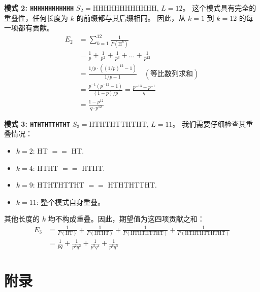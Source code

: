 \documentclass[UTF8]{ctexart}
\begin{document}
\textbf{模式 2: \texttt{HHHHHHHHHHHH}}
$S_2 = \text{HHHHHHHHHHHH}$, $L=12$。
这个模式具有完全的重叠性，任何长度为 $k$ 的前缀都与其后缀相同。
因此，从 $k=1$ 到 $k=12$ 的每一项都有贡献。
\begin{align*}
    E_2 &= \sum_{k=1}^{12} \frac{1}{P(\text{H}^k)} \\
        &= \frac{1}{p} + \frac{1}{p^2} + \frac{1}{p^3} + \dots + \frac{1}{p^{12}} \\
        &= \frac{1/p \cdot ((1/p)^{12} - 1)}{1/p - 1} \quad (\text{等比数列求和}) \\
        &= \frac{p^{-1}(p^{-12}-1)}{(1-p)/p} = \frac{p^{-13}-p^{-1}}{q} \\
        &= \frac{1-p^{12}}{q \cdot p^{12}}
\end{align*}

\textbf{模式 3: \texttt{HTHTHTTHTHT}}
$S_3 = \text{HTHTHTTHTHT}$, $L=11$。
我们需要仔细检查其重叠情况：
\begin{itemize}
    \item $k=2$: HT $==$ HT.
    \item $k=4$: HTHT $==$ HTHT.
    \item $k=9$: HTHTHTTHT $==$ HTHTHTTHT.
    \item $k=11$: 整个模式自身重叠。
\end{itemize}
其他长度的 $k$ 均不构成重叠。因此，期望值为这四项贡献之和：
\begin{align*}
    E_3 &= \frac{1}{P(\text{HT})} + \frac{1}{P(\text{HTHT})} + \frac{1}{P(\text{HTHTHTTHT})} + \frac{1}{P(\text{HTHTHTTHTHT})} \\
        &= \frac{1}{pq} + \frac{1}{p^2q^2} + \frac{1}{p^5q^4} + \frac{1}{p^6q^5}
\end{align*}


\section*{附录}
\end{document}
